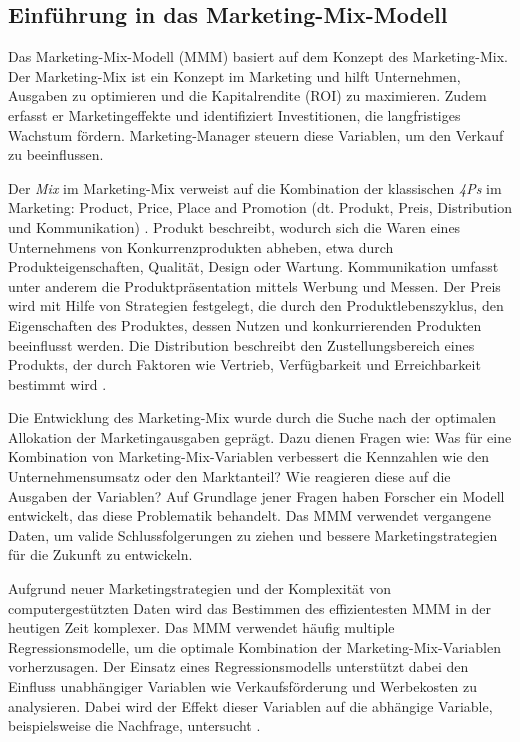 \subsection{Einführung in das Marketing-Mix-Modell}
\label{EinführungInDasMMM}
Das Marketing-Mix-Modell (\ac{MMM}) basiert auf dem Konzept des Marketing-Mix. Der Marketing-Mix ist ein Konzept im Marketing und hilft Unternehmen, Ausgaben zu optimieren und die Kapitalrendite (\ac{ROI}) zu maximieren. Zudem erfasst er Marketingeffekte und identifiziert Investitionen, die langfristiges Wachstum fördern. Marketing-Manager steuern diese Variablen, um den Verkauf zu beeinflussen. \par
Der \textit{Mix} im Marketing-Mix verweist auf die Kombination der klassischen \textit{4Ps} im Marketing: Product, Price, Place and Promotion (dt. Produkt, Preis, Distribution und Kommunikation) \cite[S. 110]{akinkunmi2018data}. Produkt beschreibt, wodurch sich die Waren eines Unternehmens von Konkurrenzprodukten abheben, etwa durch Produkteigenschaften, Qualität, Design oder Wartung. Kommunikation umfasst unter anderem die Produktpräsentation mittels Werbung und Messen. Der Preis wird mit Hilfe von Strategien festgelegt, die durch den Produktlebenszyklus, den Eigenschaften des Produktes, dessen Nutzen und  konkurrierenden Produkten beeinflusst werden. Die Distribution beschreibt den Zustellungsbereich eines Produkts, der durch Faktoren wie Vertrieb, Verfügbarkeit und Erreichbarkeit bestimmt wird \cite[109--110]{akinkunmi2018data}. \par
Die Entwicklung des Marketing-Mix wurde durch die Suche nach der optimalen Allokation der Marketingausgaben geprägt. Dazu dienen Fragen wie: Was für eine Kombination von Marketing-Mix-Variablen verbessert die Kennzahlen wie den Unternehmensumsatz oder den Marktanteil? Wie reagieren diese auf die Ausgaben der Variablen? Auf Grundlage jener Fragen haben Forscher ein Modell entwickelt, das diese Problematik behandelt. Das \ac{MMM} verwendet vergangene Daten, um valide Schlussfolgerungen zu ziehen und bessere Marketingstrategien für die Zukunft zu entwickeln. \par
Aufgrund neuer Marketingstrategien und der Komplexität von computergestützten Daten wird das Bestimmen des effizientesten \ac{MMM} in der heutigen Zeit komplexer. Das \ac{MMM} verwendet häufig multiple Regressionsmodelle, um die optimale Kombination der Marketing-Mix-Variablen vorherzusagen. Der Einsatz eines Regressionsmodells unterstützt dabei den Einfluss unabhängiger Variablen wie Verkaufsförderung und Werbekosten zu analysieren. Dabei wird der Effekt dieser Variablen auf die abhängige Variable, beispielsweise die Nachfrage, untersucht \cite[110]{akinkunmi2018data}. \par
